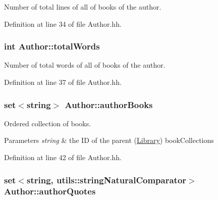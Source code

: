 Number of total lines of all of books of the author. 



Definition at line 34 of file Author.\+hh.

\subsubsection[{\texorpdfstring{total\+Words}{totalWords}}]{\setlength{\rightskip}{0pt plus 5cm}int Author\+::total\+Words\hspace{0.3cm}{\ttfamily [private]}}\hypertarget{class_author_a478c72fff965eb1ee8fcaddfe173715b}{}\label{class_author_a478c72fff965eb1ee8fcaddfe173715b}


Number of total words of all of books of the author. 



Definition at line 37 of file Author.\+hh.

\subsubsection[{\texorpdfstring{author\+Books}{authorBooks}}]{\setlength{\rightskip}{0pt plus 5cm}set$<$string$>$ Author\+::author\+Books\hspace{0.3cm}{\ttfamily [private]}}\hypertarget{class_author_ad9ffe450cdafed2242936f6fcafa22b4}{}\label{class_author_ad9ffe450cdafed2242936f6fcafa22b4}


Ordered collection of books. 


\begin{DoxyParams}{Parameters}
{\em string} & the ID of the parent (\hyperlink{class_library}{Library}) book\+Collection\textquotesingle{}s \\
\hline
\end{DoxyParams}


Definition at line 42 of file Author.\+hh.

\subsubsection[{\texorpdfstring{author\+Quotes}{authorQuotes}}]{\setlength{\rightskip}{0pt plus 5cm}set$<$string, {\bf utils\+::string\+Natural\+Comparator}$>$ Author\+::author\+Quotes\hspace{0.3cm}{\ttfamily [private]}}\hypertarget{class_author_a117bc50449e2f8d61f30632dde7d73ff}{}\label{class_author_a117bc50449e2f8d61f30632dde7d73ff}


